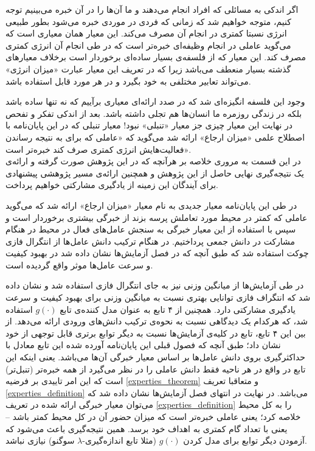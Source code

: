 اگر اندکی به مسائلی که افراد انجام می‌دهند و ما آن‌ها را در آن خبره می‌بینیم توجه کنیم، متوجه خواهیم شد که زمانی که فردی در موردی خبره می‌شود بطور طبیعی انرژی نسبتا کمتری در انجام آن مصرف می‌کند. این معیار همان معیاری است که می‌گوید عاملی در انجام وظیفه‌ای خبره‌تر است که در طی انجام آن انرژی کمتری مصرف کند. این معیار که از فلسفه‌ی بسیار ساده‌ای برخوردار است برخلاف معیار‌های گذشته بسیار منعطف می‌باشد زیرا که در تعریف این معیار عبارت «میزان انرژی» می‌تواند تعابیر مختلفی به خود بگیرد و در هر مورد قابل استفاده باشد.

وجود این فلسفه انگیزه‌ای شد که در صدد ارائه‌ای معیاری برآییم که نه تنها ساده باشد بلکه در زندگی روزمره ما انسان‌ها هم تجلی داشته باشد. بعد از اندکی تفکر و تفحص در نهایت این معیار چیزی جز معیار «تنبلی» نبود! معیار تنبلی که در این پایان‌نامه با اصطلاح علمی «میزان ارجاع» ارائه شد می‌گوید که «عاملی که برای به نتیجه رساندن فعالیت‌هایش انرژی کمتری صرف کند خبره‌تر است».\\
در این قسمت به مروری خلاصه بر هرآنچه که در این پژوهش صورت گرفته و ارائه‌ی یک نتیجه‌گیری نهایی حاصل از این پژوهش و همچنین ارائه‌ی مسیر پژوهشی پیشنهادی برای آیندگان این زمینه از یادگیری مشارکتی خواهیم پرداخت.

در طی این پایان‌نامه معیار جدیدی به نام معیار «میزان ارجاع» ارائه شد که می‌گوید عاملی که کمتر در محیط مورد تعاملش پرسه بزند از خبرگی بیشتری برخوردار است و سپس با استفاده از این معیار خبرگی به سنجش عامل‌های فعال در محیط در هنگام مشارکت در دانش جمعی پرداختیم. در هنگام ترکیب دانش عامل‌ها از انتگرال فازی چوکت استفاده شد که طبق آنچه که در فصل آزمایش‌ها نشان‌ داده شد در بهبود کیفیت و سرعت عامل‌ها موثر واقع گردیده است.

در طی آزمایش‌ها از میانگین وزنی نیز به جای انتگرال فازی استفاده شد و نشان داده شد که انتگراف فازی توانایی بهتری نسبت به میانگین وزنی برای بهبود کیفیت و سرعت یادگیری مشارکتی دارد. همچنین از ۴ تابع به عنوان مدل کننده‌ی تابع $g(\cdot)$ استفاده شد، که هرکدام یک دیدگاهی نسبت به نحوه‌ی ترکیب دانش‌های ورودی ارائه می‌دهد. از بین این ۴ تابع، تابع  در کلیه‌ی آزمایش‌ها نسبت به دیگر توابع برتری قابل توجهی از خود نشان داد؛ طبق آنچه که فصول قبلی این پایان‌نامه آورده شده این تابع معادل با حداکثرگیری بروی دانش عامل‌ها بر اساس معیار خبرگی آن‌ها می‌باشد. یعنی اینکه این تابع در واقع در هر ناحیه فقط دانش عاملی را در نظر می‌گیرد از همه خبره‌تر (تنبل‌تر) است که این امر تاییدی بر فرضیه
\ref{experties_theorem}
و متعاقبا تعریف
\ref{experties_definition}
می‌باشد. در نهایت در انتهای فصل آزمایش‌ها نشان داده شد که می‌توان معیار خبرگی ارائه شده در تعریف
\ref{experties_definition}
را به کل محیط خلاصه کرد؛ یعنی عاملی خبره‌تر است که میزان حضور آن در کل محیط کمتر باشد -- یعنی با تعداد گام کمتری به اهداف خود برسد. همین نتیجه‌گیری باعث می‌شود که آزمودن دیگر توابع برای مدل کردن $g(\cdot)$ (مثلا تابع اندازه‌گیری-$\lambda$ سوگنو) نیازی نباشد.

